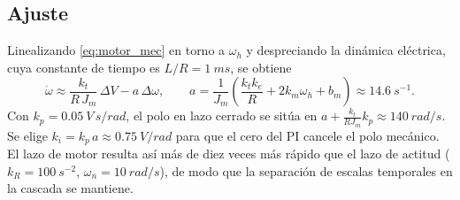 \subsection{Ajuste}
Linealizando \eqref{eq:motor_mec} en torno a $\omega_h$ y despreciando la dinámica
eléctrica, cuya constante de tiempo es $L/R = \SI{1}{ms}$, se obtiene
\begin{equation}
  \dot{\omega} \approx \frac{k_t}{R\,J_m}\,\Delta V - a\,\Delta\omega,
  \qquad
  a = \frac{1}{J_m}\left(\frac{k_t k_e}{R} + 2 k_m \omega_h + b_m\right) \approx \SI{14.6}{s^{-1}} .
\end{equation}
Con $k_p = \SI{0.05}{V\,s/rad}$, el polo en lazo cerrado se sitúa en
$a + \frac{k_t}{R J_m} k_p \approx \SI{140}{rad/s}$. Se elige
$k_i = k_p\,a \approx \SI{0.75}{V/rad}$ para que el cero del PI cancele el polo
mecánico. El lazo de motor resulta así más de diez veces más rápido que el lazo de
actitud ($k_R = \SI{100}{s^{-2}}$, $\omega_n = \SI{10}{rad/s}$), de modo que la
separación de escalas temporales en la cascada se mantiene.
